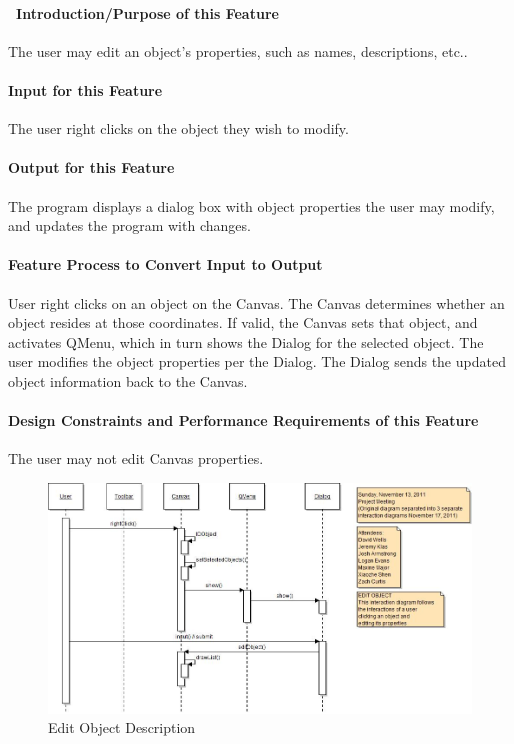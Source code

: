 \documentclass[twoside,letterpaper]{article}
\begin{document}
{\paragraph[\ Introduction/Purpose of this Feature]
{\ Introduction/Purpose of this Feature}
{
The user may edit an object{\textquoteright}s properties, such as names, descriptions, etc..
}

\paragraph[Input for this Feature]{Input for this Feature}
{
The user right clicks on the object they wish to modify.
}

\paragraph{Output for this Feature}
{
The program displays a dialog box with object properties the user may modify, and updates the program with changes.
}

\paragraph{Feature Process to Convert Input to Output}
{
User right clicks on an object on the Canvas. The Canvas determines whether an object resides at those coordinates. If valid, the Canvas sets that object, and activates QMenu, which in turn shows the Dialog for the selected object.
The user modifies the object properties per the Dialog.  The Dialog sends the updated object information back to the Canvas.
}

\paragraph{Design Constraints and Performance Requirements of this Feature}
{
The user may not edit Canvas properties.
}
\bigskip
\bigskip

\begin{figure}[h]
\centering
\includegraphics[width=6.0in]{IntEditObj.jpg}
\caption{Edit Object Description}
\end{figure}

}
\end{document}
